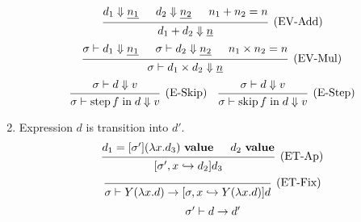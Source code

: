 \documentclass{article}
\newcommand{\evalsto}{\mathrel{\mathop{\Downarrow}}}
\newcommand{\hooksto}{\mathrel{\mathop{\hookrightarrow}}}
\newcommand{\entails}{\mathrel{\mathop{\vdash}}}
\newcommand{\ival}{~\mathbf{value}}
\DeclareMathOperator{\fskip}{skip}
\DeclareMathOperator{\fstep}{step}
\newcommand{\fin}{\mathrel{\mathop{\text{in}}}}
\newcommand{\flet}{\mathrm{let}~}
\begin{document}
\begin{enumerate}
\[    \]
    \[
      \begin{prooftree}
        \hypo{d_1 \evalsto \underline{n_1}}
        \hypo{d_2 \evalsto \underline{n_2}}
        \hypo{n_1 + n_2 = n}
        \infer3[(EV-Add)]{d_1 + d_2 \evalsto \underline{n}}
      \end{prooftree}
    \]
    \[
      \begin{prooftree}
        \hypo{\sigma \entails d_1 \evalsto \underline{n_1}}
        \hypo{\sigma \entails d_2 \evalsto \underline{n_2}}
        \hypo{n_1 \times n_2 = n}
        \infer3[(EV-Mul)]{\sigma \entails d_1 \times d_2 \evalsto \underline{n}}
      \end{prooftree}
    \]
    \[
      \begin{prooftree}
        \hypo{\sigma \entails d \evalsto v}
        \infer1[(E-Skip)]{\sigma \entails \fstep f \fin d \evalsto v}
      \end{prooftree}
      \quad
      \begin{prooftree}
        \hypo{\sigma \entails d \evalsto v}
        \infer1[(E-Step)]{\sigma \entails \fskip f \fin d \evalsto v}
      \end{prooftree}
    \]
  \item {} Expression \(d\) is transition into \(d'\).
    \[
      \begin{prooftree}
        \hypo{d_1 = [\sigma'] (\lambda x . d_3) \ival}
        \hypo{d_2 \ival}
        \infer2[(ET-Ap)]{[\sigma', x \hooksto d_2] d_3}
      \end{prooftree}
    \]
    \[
      \begin{prooftree}
        \infer0[(ET-Fix)]{\sigma \entails Y (\lambda x . d) \to [\sigma, x \hooksto Y (\lambda x . d)]d}
      \end{prooftree}
    \]
    \[
      \begin{prooftree}
        \hypo{\sigma' \entails d \to d'}

\end{prooftree}\]
\end{enumerate}
\end{document}
